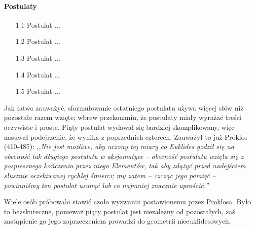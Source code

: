 \paragraph{Postulaty}	
\begin{enumerate}	
    \item [1.1] Postulat ... %
    \item [1.2] Postulat ... %
    \item [1.3] Postulat ... %
    \item [1.4] Postulat ... %
    \item [1.5] Postulat ... %
\end{enumerate}	
	
Jak łatwo zauważyć, sformułowanie ostatniego postulatu używa więcej słów niż pozostałe razem wzięte; wbrew przekonaniu, że postulaty miały wyrażać treści oczywiste i proste.	
Piąty postulat wydawał się bardziej skomplikowany, więc nasuwał podejrzenie, że wynika z poprzednich czterech.	
Zauważył to już Proklos (410-485): \emph{,,Nie jest możliwe, aby uczony tej miary co Euklides godził się na obecność tak długiego postulatu w aksjomatyce -- obecność postulatu wzięła się z pospiesznego kończenia przez niego Elementów, tak aby zdążyć przed nadejściem słusznie oczekiwanej rychłej śmierci; my zatem -- czcząc jego pamięć -- powinniśmy ten postulat usunąć lub co najmniej znacznie uprościć.''}	
	
Wiele osób próbowało stawić czoło wyzwaniu postawionemu przez Proklosa.	
Było to bezskuteczne, ponieważ piąty postulat jest niezależny od pozostałych, zaś zastąpienie go jego zaprzeczeniem prowadzi do geometrii nieeuklidesowych.	
	
